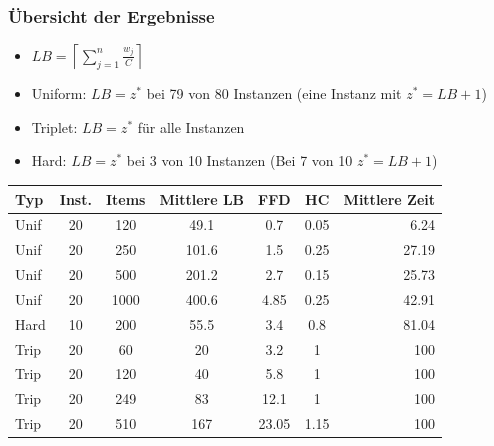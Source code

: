 \documentclass{beamer}
\begin{document}
\begin{frame}
\frametitle{Übersicht der Ergebnisse}
\begin{footnotesize}
\begin{itemize}
\item $LB = \left\lceil\sum_{j=1}^{n} \frac{w_j}{C}\right\rceil$
\item Uniform: $LB = z^{*}$ bei 79 von 80 Instanzen (eine Instanz mit $z^{*} = LB + 1$)
\item Triplet: $LB = z^{*}$ für alle Instanzen 
\item Hard: $LB = z^{*}$ bei 3 von 10 Instanzen (Bei 7 von 10 $z^{*} = LB + 1$) 
\end{itemize}
\end{footnotesize}
\begin{table}
\begin{tabular}{l c c c c c r}
\toprule
\textbf{Typ} & \textbf{Inst.} & \textbf{Items} & \textbf{Mittlere LB} & \textbf{FFD} & \textbf{HC} & \textbf{Mittlere Zeit}\\
\midrule
Unif  & 20   & 120 & 49.1  & 0.7 & 0.05 & 6.24 \\
Unif  & 20   & 250  & 101.6  & 1.5 & 0.25 & 27.19 \\
Unif  & 20   & 500  & 201.2  & 2.7 & 0.15 & 25.73\\
Unif  & 20   & 1000  & 400.6  & 4.85 & 0.25 & 42.91\\ \midrule
Hard  & 10   & 200  & 55.5  & 3.4 & 0.8 &  81.04 \\\midrule
Trip  & 20   & 60   & 20  & 3.2 & 1 & 100 \\
Trip  & 20   & 120  & 40  & 5.8 & 1 & 100 \\
Trip  & 20   & 249  & 83  & 12.1 & 1 & 100 \\
Trip  & 20   & 510  & 167  & 23.05 & 1.15 & 100 \\

\bottomrule
\end{tabular}
\end{table}
\end{frame}


\end{document}
